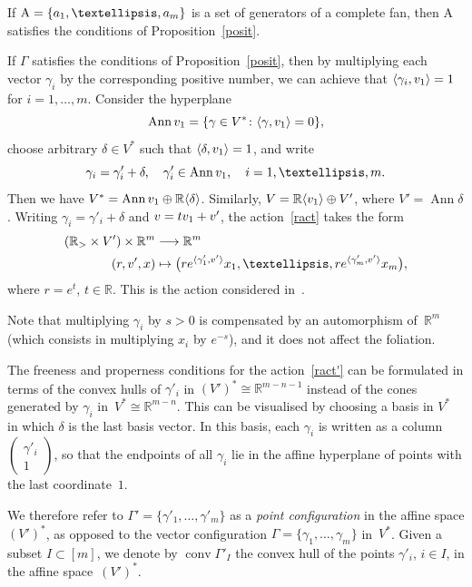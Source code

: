\documentclass[a4paper]{amsart}
\theoremstyle{definition}
\theoremstyle{remark}
\numberwithin{equation}{section}
\def\R{\mathbb R}
\def\R{\mathbb R}
\newcommand{\mb}[1]{{\textbf {\textit#1}}}
\def\Ann{\mathop{\mathrm{Ann}}}
\def\conv{\mathop{\mathrm{conv}}}
\newcommand{\<}{\langle}
\renewcommand{\>}{\rangle}
\begin{document}
If $\mathrm A=\{\mb a_1,\ldots,\mb a_m\}$ is a set of generators of a complete fan, then $\mathrm A$ satisfies the conditions of Proposition~\ref{posit}.

If $\Gamma$ satisfies the conditions of Proposition~\ref{posit}, then by multiplying each vector $\gamma_i$ by the corresponding positive number, we can achieve that 
$\langle\gamma_i,\mb v_1\rangle=1$ for $i=1,\ldots,m$. Consider the hyperplane
\[
  \Ann\mb v_1=\{\gamma\in V^*\colon \langle\gamma,\mb v_1\rangle=0\},
\]
choose arbitrary $\delta\in V^*$ such that $\langle\delta,\mb v_1\rangle=1$, and write 
\[
  \gamma_i=\gamma'_i+\delta,\quad \gamma'_i\in \Ann\mb v_1,\quad i=1,\ldots,m.
\]
Then we have $V^*=\Ann\mb v_1\oplus\R\langle\delta\rangle$.
Similarly, $V=\R\langle\mb v_1\rangle\oplus V'$, where $V'=\Ann\delta$. Writing 
$\gamma_i=\gamma'_i+\delta$ and $\mb v=t\mb v_1+\mb v'$, the action~\eqref{ract} takes the form
\begin{equation}\label{ract'}
\begin{aligned}
  (\R_>\times V')\times\R^m&\longrightarrow\R^m\\
  (r,\mb v',\mb x)&\mapsto \bigl(re^{\langle\gamma'_1,\mb
  v'\rangle}x_1,\ldots,re^{\langle\gamma'_m,\mb v'\rangle}x_m\bigr),
\end{aligned}
\end{equation}
where $r=e^t$, $t\in\R$. This is the action considered in~\cite{bo-me06}.

Note that multiplying $\gamma_i$ by $s>0$ is compensated by an automorphism 
of~$\R^m$ (which consists in multiplying $x_i$ by $e^{-s}$), and it does not affect the foliation.


The freeness and properness conditions for the action~\eqref{ract'} can be formulated in terms of the convex hulls of $\gamma'_i$ in $(V')^*\cong\R^{m-n-1}$ instead of the cones generated by $\gamma_i$ in~$V^*\cong\R^{m-n}$. This can be visualised by choosing a basis in $V^*$ in which $\delta$ is the last basis vector. In this basis, each $\gamma_i$ is written as a column 
$\begin{pmatrix}\gamma'_i\\1\end{pmatrix}$, so that the endpoints of all $\gamma_i$ lie in the affine hyperplane of points with the last coordinate~$1$.  

We therefore refer to $\Gamma'=\{\gamma'_1,\ldots,\gamma'_m\}$ as a \emph{point configuration} in the affine space $(V')^*$, as opposed to the vector configuration $\Gamma=\{\gamma_1,\ldots,\gamma_m\}$ in~$V^*$.
Given a subset $I\subset[m]$, we denote by $\conv\Gamma'_I$ the convex hull of  the points $\gamma'_i$, $i\in I$, in the affine space~$(V')^*$.
\end{document}
